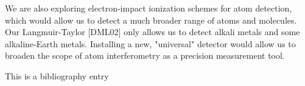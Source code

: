 \documentclass[12pt,letterpaper]{article}
\begin{document}
We are also exploring electron-impact ionization schemes for atom detection, which would allow us to detect a much broader range of atoms and molecules. Our Langmuir-Taylor [DML02] only allows us to detect alkali metals and some alkaline-Earth metals. Installing a new, "universal" detector would allow us to broaden the scope of atom interferometry as a precision measurement tool. 








\singlespace
\pagebreak
\begin{thebibliography}{9}
        This is a bibliography entry
\end{thebibliography}
\end{document}
